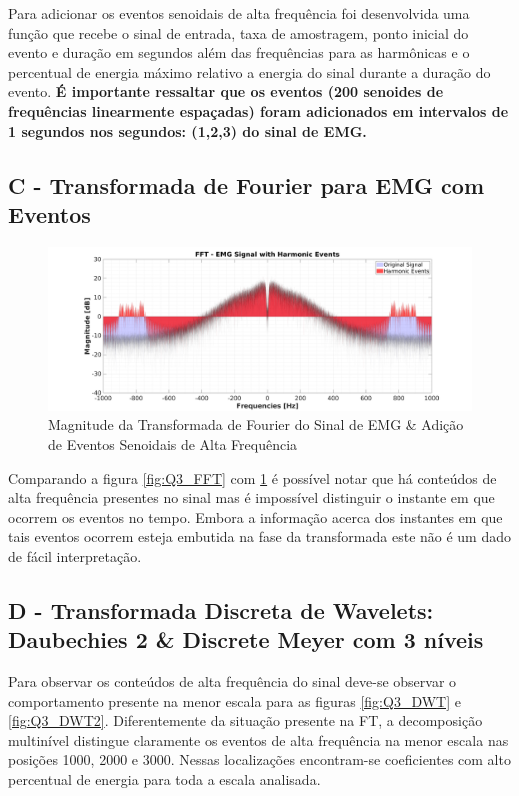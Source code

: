 \documentclass{article}
\begin{document}
Para adicionar os eventos senoidais de alta frequência foi desenvolvida uma função que recebe o sinal de entrada, taxa de amostragem, ponto inicial do evento e duração em segundos além das frequências para as harmônicas e o percentual de energia máximo relativo a energia do sinal durante a duração do evento. \textbf{É importante ressaltar que os eventos (200 senoides de frequências linearmente espaçadas) foram adicionados em intervalos de 1 segundos nos segundos: (1,2,3) do sinal de EMG.}



\subsection*{C - Transformada de Fourier para EMG com Eventos}

\begin{figure}[H]
	\begin{center}
		\includegraphics[scale=0.25]{../Q3_FFT-Events.png}
		\caption{Magnitude da Transformada de Fourier do Sinal de EMG \& Adição de Eventos Senoidais de Alta Frequência}
		\label{fig:Q3_FFT2}
	\end{center}
\end{figure}


Comparando a figura \ref{fig:Q3_FFT} com \ref{fig:Q3_FFT2} é possível notar que há conteúdos de alta frequência presentes no sinal mas é impossível distinguir o instante em que ocorrem os eventos no tempo. Embora a informação acerca dos instantes em que tais eventos ocorrem esteja embutida na fase da transformada este não é um dado de fácil interpretação.

\subsection*{D - Transformada Discreta de Wavelets: Daubechies 2 \& Discrete Meyer com 3 níveis}
Para observar os conteúdos de alta frequência do sinal deve-se observar o comportamento presente na menor escala para as figuras \ref{fig:Q3_DWT} e \ref{fig:Q3_DWT2}. Diferentemente da situação presente na FT, a decomposição multinível distingue claramente os eventos de alta frequência na menor escala nas posições 1000, 2000 e 3000. Nessas localizações encontram-se coeficientes com alto percentual de energia para toda a escala analisada.
\end{document}
